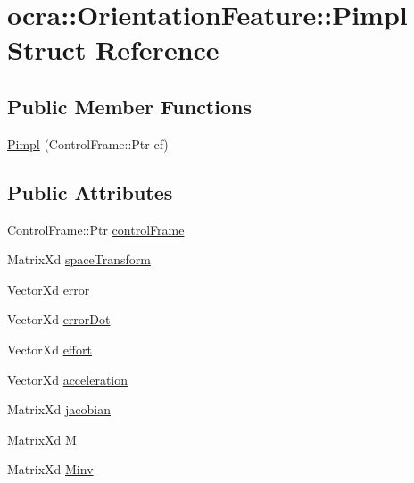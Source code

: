 \hypertarget{structocra_1_1OrientationFeature_1_1Pimpl}{}\section{ocra\+:\+:Orientation\+Feature\+:\+:Pimpl Struct Reference}
\label{structocra_1_1OrientationFeature_1_1Pimpl}
\subsection*{Public Member Functions}
\begin{DoxyCompactItemize}
\item 
\hyperlink{structocra_1_1OrientationFeature_1_1Pimpl_aa5a7e987e6c60ebd03c2acb696f85258}{Pimpl} (Control\+Frame\+::\+Ptr cf)
\end{DoxyCompactItemize}
\subsection*{Public Attributes}
\begin{DoxyCompactItemize}
\item 
Control\+Frame\+::\+Ptr \hyperlink{structocra_1_1OrientationFeature_1_1Pimpl_ace6d37214be072ece7305a45e35569c8}{control\+Frame}
\item 
Matrix\+Xd \hyperlink{structocra_1_1OrientationFeature_1_1Pimpl_aabbe93797831b01bda2453053e2a1224}{space\+Transform}
\item 
Vector\+Xd \hyperlink{structocra_1_1OrientationFeature_1_1Pimpl_ac388b9a7c770d1c5af07c5b8f011a430}{error}
\item 
Vector\+Xd \hyperlink{structocra_1_1OrientationFeature_1_1Pimpl_ad7b019fb36061c7906b7d68cd107a542}{error\+Dot}
\item 
Vector\+Xd \hyperlink{structocra_1_1OrientationFeature_1_1Pimpl_a4e6285f990db663f2c73f629ae854650}{effort}
\item 
Vector\+Xd \hyperlink{structocra_1_1OrientationFeature_1_1Pimpl_a71af076a18a38a72ec80d781b03b391b}{acceleration}
\item 
Matrix\+Xd \hyperlink{structocra_1_1OrientationFeature_1_1Pimpl_ae01a611368d744168c0b1cb036e9f3ca}{jacobian}
\item 
Matrix\+Xd \hyperlink{structocra_1_1OrientationFeature_1_1Pimpl_aad4500eb6e53d95fa7727e448616a312}{M}
\item 
Matrix\+Xd \hyperlink{structocra_1_1OrientationFeature_1_1Pimpl_a4d3638027be99fabf73eefd55015ce44}{Minv}
\end{DoxyCompactItemize}


